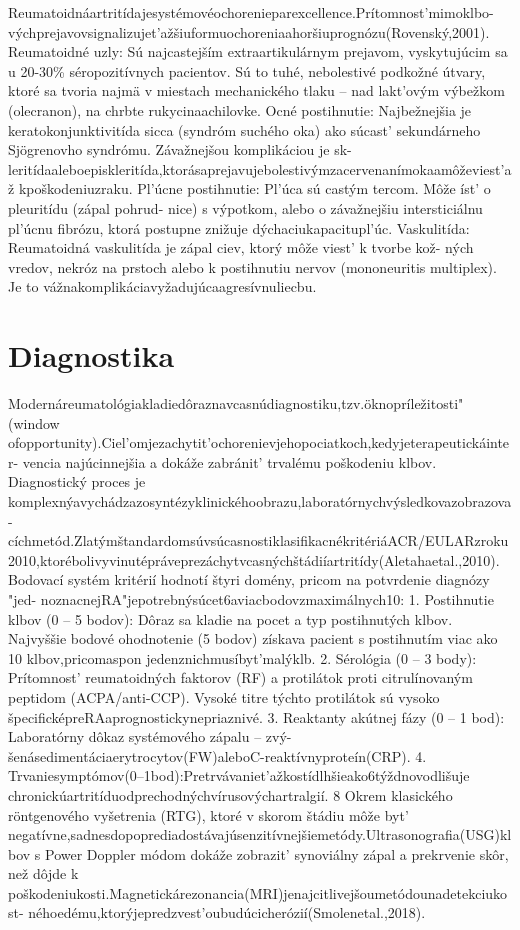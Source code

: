Reumatoidnáartritídajesystémovéochorenieparexcellence.Prítomnost’mimoklbo- výchprejavovsignalizujet’ažšiuformuochoreniaahoršiuprognózu(Rovenský,2001). Reumatoidné uzly: Sú najcastejším extraartikulárnym prejavom, vyskytujúcim sa u 20-30\% séropozitívnych pacientov. Sú to tuhé, nebolestivé podkožné útvary, ktoré sa tvoria najmä v miestach mechanického tlaku -- nad lakt’ovým výbežkom (olecranon), na chrbte rukycinaachilovke. Ocné postihnutie: Najbežnejšia je keratokonjunktivitída sicca (syndróm suchého oka) ako súcast’ sekundárneho Sjögrenovho syndrómu. Závažnejšou komplikáciou je sk- leritídaaleboepiskleritída,ktorásaprejavujebolestivýmzacervenanímokaamôževiest’až kpoškodeniuzraku. Pl’úcne postihnutie: Pl’úca sú castým tercom. Môže íst’ o pleuritídu (zápal pohrud- nice) s výpotkom, alebo o závažnejšiu intersticiálnu pl’úcnu fibrózu, ktorá postupne znižuje dýchaciukapacitupl’úc. Vaskulitída: Reumatoidná vaskulitída je zápal ciev, ktorý môže viest’ k tvorbe kož- ných vredov, nekróz na prstoch alebo k postihnutiu nervov (mononeuritis multiplex). Je to vážnakomplikáciavyžadujúcaagresívnuliecbu.


\section{Diagnostika}

Modernáreumatológiakladiedôraznavcasnúdiagnostiku,tzv.öknopríležitosti"(window ofopportunity).Ciel’omjezachytit’ochorenievjehopociatkoch,kedyjeterapeutickáinter- vencia najúcinnejšia a dokáže zabránit’ trvalému poškodeniu klbov. Diagnostický proces je komplexnýavychádzazosyntézyklinickéhoobrazu,laboratórnychvýsledkovazobrazova- cíchmetód.ZlatýmštandardomsúvsúcasnostiklasifikacnékritériáACR/EULARzroku 2010,ktorébolivyvinutépráveprezáchytvcasnýchštádiíartritídy(Aletahaetal.,2010). Bodovací systém kritérií hodnotí štyri domény, pricom na potvrdenie diagnózy "jed- noznacnejRA"jepotrebnýsúcet6aviacbodovzmaximálnych10: 1. Postihnutie klbov (0 -- 5 bodov): Dôraz sa kladie na pocet a typ postihnutých klbov. Najvyššie bodové ohodnotenie (5 bodov) získava pacient s postihnutím viac ako 10 klbov,pricomaspon jedenznichmusíbyt’malýklb. 2. Sérológia (0 -- 3 body): Prítomnost’ reumatoidných faktorov (RF) a protilátok proti citrulínovaným peptidom (ACPA/anti-CCP). Vysoké titre týchto protilátok sú vysoko špecificképreRAaprognostickynepriaznivé. 3. Reaktanty akútnej fázy (0 -- 1 bod): Laboratórny dôkaz systémového zápalu -- zvý- šenásedimentáciaerytrocytov(FW)aleboC-reaktívnyproteín(CRP). 4. Trvaniesymptómov(0--1bod):Pretrvávaniet’ažkostídlhšieako6týždnovodlišuje chronickúartritíduodprechodnýchvírusovýchartralgií. 8 Okrem klasického röntgenového vyšetrenia (RTG), ktoré v skorom štádiu môže byt’ negatívne,sadnesdopoprediadostávajúsenzitívnejšiemetódy.Ultrasonografia(USG)klbov s Power Doppler módom dokáže zobrazit’ synoviálny zápal a prekrvenie skôr, než dôjde k poškodeniukosti.Magnetickárezonancia(MRI)jenajcitlivejšoumetódounadetekciukost- néhoedému,ktorýjepredzvest’oubudúcicherózií(Smolenetal.,2018).


